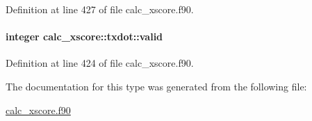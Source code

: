 Definition at line 427 of file calc\-\_\-xscore.\-f90.

\hypertarget{structcalc__xscore_1_1txdot_a34c5c77921f059525edad9a1ff90b537}{
\paragraph[{valid}]{\setlength{\rightskip}{0pt plus 5cm}integer calc\-\_\-xscore\-::txdot\-::valid}}\label{structcalc__xscore_1_1txdot_a34c5c77921f059525edad9a1ff90b537}


Definition at line 424 of file calc\-\_\-xscore.\-f90.



The documentation for this type was generated from the following file\-:\begin{DoxyCompactItemize}
\item 
\hyperlink{calc__xscore_8f90}{calc\-\_\-xscore.\-f90}\end{DoxyCompactItemize}
